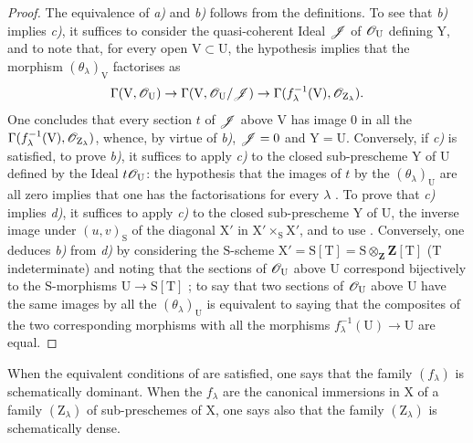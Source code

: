 \begin{proof}
The equivalence of \emph{a)} and \emph{b)} follows from the definitions.
To see that \emph{b)} implies \emph{c)}, it suffices to consider the quasi-coherent Ideal $\mathscr{J}$ of $\mathscr{O}_\mathrm{U}$ defining $\mathrm{Y}$, and to note that, for every open $\mathrm{V}\subset\mathrm{U}$, the hypothesis implies that the morphism $(\theta_\lambda)_\mathrm{V}$ factorises as
\[
  \Gamma(\mathrm{V},\mathscr{O}_\mathrm{U})\to\Gamma(\mathrm{V},\mathscr{O}_\mathrm{U}/\mathscr{J})\to\Gamma(f_\lambda^{-1}(\mathrm{V}),\mathscr{O}_{\mathrm{Z}_\lambda}).
\]
One concludes that every section $t$ of $\mathscr{J}$ above $\mathrm{V}$ has image $0$ in all the $\Gamma(f_\lambda^{-1}(\mathrm{V}),\mathscr{O}_{\mathrm{Z}_\lambda})$, whence, by virtue of \emph{b)}, $\mathscr{J}=0$ and $\mathrm{Y}=\mathrm{U}$.
Conversely, if \emph{c)} is satisfied, to prove \emph{b)}, it suffices to apply \emph{c)} to the closed sub-prescheme $\mathrm{Y}$ of $\mathrm{U}$ defined by the Ideal $t\mathscr{O}_\mathrm{U}$: the hypothesis that the images of $t$ by the $(\theta_\lambda)_\mathrm{U}$ are all zero implies that one has the factorisations  for every $\lambda$ .
To prove that \emph{c)} implies \emph{d)}, it suffices to apply \emph{c)} to the closed sub-prescheme $\mathrm{Y}$ of $\mathrm{U}$, the inverse image under $(u,v)_\mathrm{S}$ of the diagonal $\mathrm{X}'$ in $\mathrm{X}'\times_\mathrm{S}\mathrm{X}'$, and to use .
Conversely, one deduces \emph{b)} from \emph{d)} by considering the $\mathrm{S}$-scheme $\mathrm{X}'=\mathrm{S}[\mathrm{T}]=\mathrm{S}\otimes_\mathbf{Z}\mathbf{Z}[\mathrm{T}]$ ($\mathrm{T}$ indeterminate) and noting that the sections of $\mathscr{O}_\mathrm{U}$ above $\mathrm{U}$ correspond bijectively to the $\mathrm{S}$-morphisms $\mathrm{U}\to\mathrm{S}[\mathrm{T}]$ ; to say that two sections of $\mathscr{O}_\mathrm{U}$ above $\mathrm{U}$ have the same images by all the $(\theta_\lambda)_\mathrm{U}$ is equivalent to saying that the composites of the two corresponding morphisms with all the morphisms $f_\lambda^{-1}(\mathrm{U})\to\mathrm{U}$ are equal.
\end{proof}

\begin{definition}[11.10.2]
\label{IV.11.10.2}
When the equivalent conditions of  are satisfied, one says that the family $(f_\lambda)$ is schematically dominant.
When the $f_\lambda$ are the canonical immersions in $\mathrm{X}$ of a family $(\mathrm{Z}_\lambda)$ of sub-preschemes of $\mathrm{X}$, one says also that the family $(\mathrm{Z}_\lambda)$ is schematically dense.
\end{definition}

